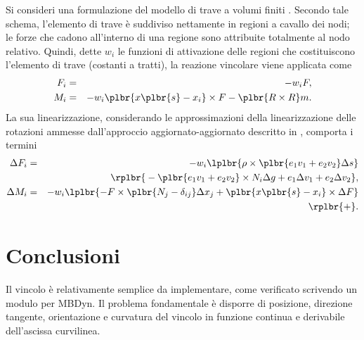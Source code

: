 \documentclass[12pt,dvips,fleqn,italian]{article}
\begin{document}
\noindent
Si consideri una formulazione del modello di trave a volumi finiti
\cite{FV-AIAA}.
Secondo tale schema, l'elemento di trave \`{e} suddiviso nettamente in
regioni a cavallo dei nodi; le forze che cadono all'interno di una regione
sono attribuite totalmente al nodo relativo.
Quindi, dette $w_i$ le funzioni di attivazione delle regioni che
costituiscono l'elemento di trave (costanti a tratti), la reazione vincolare
viene applicata come
\begin{eqnarray*}
    F_i & = & - w_i F , \\
    M_i & = & - w_i \plbr{ x\plbr{s} - x_i }\times F 
        - \plbr{ R \times R } m .
\end{eqnarray*}
La sua linearizzazione, considerando le approssimazioni della
linearizzazione delle rotazioni ammesse dall'approccio aggiornato-aggiornato
descritto in \cite{PHD-MASARATI}, comporta i termini
\begin{eqnarray*}
    \Delta{F_i} & = & - w_i \lplbr{
        \rho \times \plbr{ e_1 v_1 + e_2 v_2 } \Delta{s}
    } \\
    & & \rplbr{ \mbox{}
	- \plbr{ e_1 v_1 + e_2 v_2 } \times N_i \Delta{g}
	+ e_1 \Delta{v_1} + e_2 \Delta{v_2}
    } , \\
    \Delta{M_i} & = & - w_i \lplbr{
        - F \times \plbr{ N_j - \delta_{ij} }\Delta{ x_j }
	+ \plbr{ x\plbr{s} - x_i }\times \Delta{F}
    } \\
    & & \rplbr{ \mbox{}
        +
    } .
\end{eqnarray*}




\section*{Conclusioni}
Il vincolo \`{e} relativamente semplice da implementare, come verificato
scrivendo un modulo per MBDyn. 
Il problema fondamentale \`{e} disporre di posizione, direzione tangente,
orientazione e curvatura del vincolo in funzione continua e derivabile
dell'ascissa curvilinea.





\end{document}
